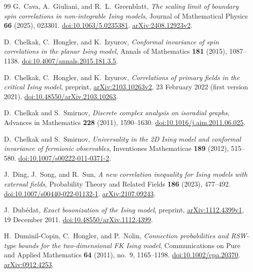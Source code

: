 \begin{thebibliography}{99}
G.~Cava, A.~Giuliani, and R.~L.~Greenblatt,
\emph{The scaling limit of boundary spin correlations in non-integrable
Ising models},
Journal of Mathematical Physics \textbf{66} (2025), 023301.
\href{https://doi.org/10.1063/5.0235381}{doi:10.1063/5.0235381}.
\href{https://arxiv.org/abs/2408.12923v2}{arXiv:2408.12923v2}.

D.~Chelkak, C.~Hongler, and K.~Izyurov,
\emph{Conformal invariance of spin correlations in the planar Ising model},
Annals of Mathematics \textbf{181} (2015), 1087--1138.
\href{https://doi.org/10.4007/annals.2015.181.3.5}{doi:10.4007/annals.2015.181.3.5}.

D.~Chelkak, C.~Hongler, and K.~Izyurov,
\emph{Correlations of primary fields in the critical Ising model},
preprint, \href{https://arxiv.org/abs/2103.10263v2}{arXiv:2103.10263v2},
23 February 2022 (first version 2021).
\href{https://doi.org/10.48550/arXiv.2103.10263}{doi:10.48550/arXiv.2103.10263}.

D.~Chelkak and S.~Smirnov,
\emph{Discrete complex analysis on isoradial graphs},
Advances in Mathematics \textbf{228} (2011), 1590--1630.
\href{https://doi.org/10.1016/j.aim.2011.06.025}{doi:10.1016/j.aim.2011.06.025}.

D.~Chelkak and S.~Smirnov,
\emph{Universality in the 2D Ising model and conformal invariance of fermionic observables},
Inventiones Mathematicae \textbf{189} (2012), 515--580.
\href{https://doi.org/10.1007/s00222-011-0371-2}{doi:10.1007/s00222-011-0371-2}.

J.~Ding, J.~Song, and R.~Sun,
\emph{A new correlation inequality for Ising models with external
fields},
Probability Theory and Related Fields \textbf{186} (2023), 477--492.
\href{https://doi.org/10.1007/s00440-022-01132-1}{doi:10.1007/s00440-022-01132-1}.
\href{https://arxiv.org/abs/2107.09243}{arXiv:2107.09243}.

J.~Dub\'edat,
\emph{Exact bosonization of the Ising model},
preprint, \href{https://arxiv.org/abs/1112.4399v1}{arXiv:1112.4399v1},
19 December 2011.
\href{https://doi.org/10.48550/arXiv.1112.4399}{doi:10.48550/arXiv.1112.4399}.

H.~Duminil-Copin, C.~Hongler, and P.~Nolin,
\emph{Connection probabilities and RSW-type bounds for the
two-dimensional FK Ising model},
Communications on Pure and Applied Mathematics \textbf{64} (2011),
no.~9, 1165--1198.
\href{https://doi.org/10.1002/cpa.20370}{doi:10.1002/cpa.20370}.
\href{https://arxiv.org/abs/0912.4253}{arXiv:0912.4253}.


\end{thebibliography}

